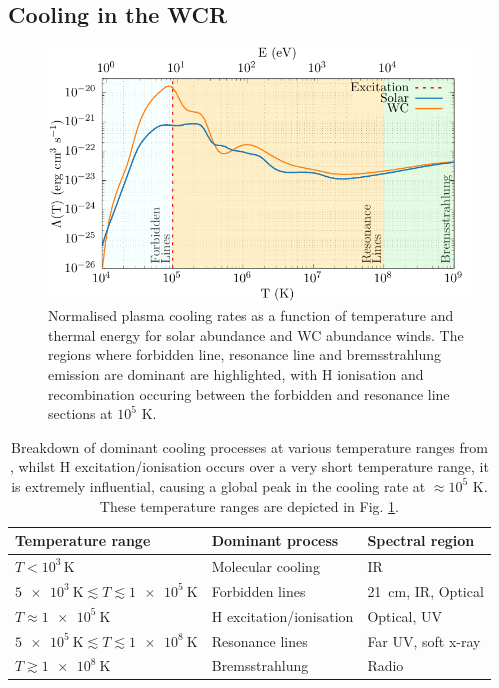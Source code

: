 \subsection{Cooling in the WCR}
\label{sec:wcrcooling}
\begin{figure}[h]
  \centering
  \includegraphics{assets/cooling-breakdown/cooling-curve-solar-withev.pdf}
  \caption[WC \& solar abundance plasma cooling curves]{Normalised plasma cooling rates as a function of temperature and thermal energy for solar abundance and WC abundance winds. The regions where forbidden line, resonance line and bremsstrahlung emission are dominant are highlighted, with H ionisation and recombination occuring between the forbidden and resonance line sections at $10^5$ \si{\kelvin}.}
  \label{fig:wcsolcooling}
\end{figure}

\begin{table}[h]
  \centering
  \begin{tabular}{lll}
  \hline 
  Temperature range & Dominant process & Spectral region \\
  \hline
  $T < 10^3 \, \si{\kelvin}$ & Molecular cooling & IR \\
  $\SI{5e3}{\kelvin} \lesssim T \lesssim \SI{1e5}{\kelvin} $ & Forbidden lines & \SI{21}{cm}, IR, Optical \\
  $T \approx \SI{1e5}{\kelvin}$ & H excitation/ionisation & Optical, UV \\
  $\SI{5e5}{\kelvin} \lesssim T \lesssim \SI{1e8}{\kelvin} $ & Resonance lines & Far UV, soft x-ray \\
  $T \gtrsim \SI{1e8}{\kelvin} $ & Bremsstrahlung & Radio \\ \hline
  \end{tabular}
  \caption[Cooling processes at various temperature ranges]{Breakdown of dominant cooling processes at various temperature ranges from \textcite[Ch.~6]{dysonPhysicsInterstellarMedium2021}, whilst H excitation/ionisation occurs over a very short temperature range, it is extremely influential, causing a global peak in the cooling rate at $\approx 10^5$ \si{\kelvin}. These temperature ranges are depicted in Fig. \ref{fig:wcsolcooling}.}
  \label{tab:coolprocess}
\end{table}


